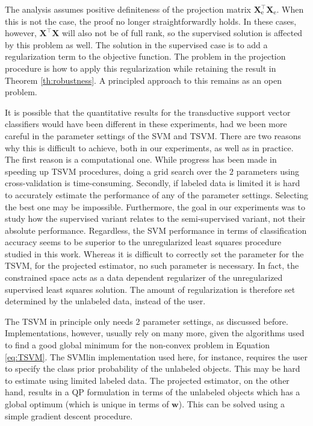 \documentclass{article}
\renewcommand{\vec}[1]{\mathbf{#1}}
\begin{document}
The analysis assumes positive definiteness of the projection matrix $\vec{X}_\text{e}^\top \vec{X}_\text{e}$. When this is not the case, the proof no longer straightforwardly holds. In these cases, however, $\vec{X}^\top \vec{X}$ will also not be of full rank, so the supervised solution is affected by this problem as well. The solution in the supervised case is to add a regularization term to the objective function. The problem in the projection procedure is how to apply this regularization while retaining the result in Theorem \ref{th:robustness}. A principled approach to this remains as an open problem.

It is possible that the quantitative results for the transductive support vector classifiers would have been different in these experiments, had we been more careful in the parameter settings of the SVM and TSVM. There are two reasons why this is difficult to achieve, both in our experiments, as well as in practice. The first reason is a computational one. While progress has been made in speeding up TSVM procedures, doing a grid search over the $2$ parameters using cross-validation is time-consuming. Secondly, if labeled data is limited it is hard to accurately estimate the performance of any of the parameter settings. Selecting the best one may be impossible. Furthermore, the goal in our experiments was to study how the supervised variant relates to the semi-supervised variant, not their absolute performance. Regardless, the SVM performance in terms of classification accuracy seems to be superior to the unregularized least squares procedure studied in this work. Whereas it is difficult to correctly set the parameter for the TSVM, for the projected estimator, no such parameter is necessary. In fact, the constrained space acts as a data dependent regularizer of the unregularized supervised least squares solution. The amount of regularization is therefore set determined by the unlabeled data, instead of the user.

The TSVM in principle only needs 2 parameter settings, as discussed before. Implementations, however, usually rely on many more, given the algorithms used to find a good global minimum for the non-convex problem in Equation \eqref{eq:TSVM}. The SVMlin implementation used here, for instance, requires the user to specify the class prior probability of the unlabeled objects. This may be hard to estimate using limited labeled data. The projected estimator, on the other hand, results in a  QP formulation in terms of the unlabeled objects which has a global optimum (which is unique in terms of $\vec{w}$). This can be solved using a simple gradient descent procedure. 
\end{document}

